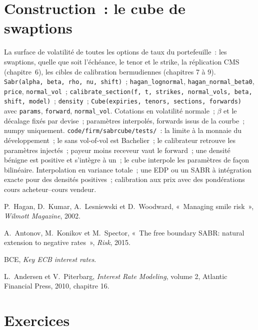 \section{Construction~: le cube de swaptions}\label{bld:rc:sabr-in-rates-and-the-volatility-cube:sabrcube}

\begin{build}
 La surface de volatilité de toutes les options de taux du portefeuille~:
les swaptions, quelle que soit l'échéance, le tenor et le strike, la réplication CMS (chapitre~6),
les cibles de calibration bermudiennes (chapitres 7 à 9).
 \texttt{Sabr(alpha, beta, rho, nu, shift)}~;
\texttt{hagan\_lognormal}, \texttt{hagan\_normal\_beta0}, \texttt{price},
\texttt{normal\_vol}~; \texttt{calibrate\_section(f, t, strikes, normal\_vols,
beta, shift, model)}~; \texttt{density}~; \texttt{Cube(expiries, tenors, sections,
forwards)} avec \texttt{params}, \texttt{forward}, \texttt{normal\_vol}.
 Cotations en volatilité normale~; $\beta$ et le décalage fixés par
devise~; paramètres interpolés, forwards issus de la courbe~; numpy uniquement.
 \texttt{code/firm/sabrcube/tests/}~: la limite à la monnaie
du développement~; le  sans vol-of-vol est Bachelier~; le
calibrateur retrouve les paramètres injectés~; payeur moins receveur vaut le forward~;
une densité bénigne est positive et s'intègre à un~; le cube interpole
les paramètres de façon bilinéaire.
 Interpolation en variance totale~; une EDP ou un SABR à intégration exacte
pour des densités positives~; calibration aux prix avec des pondérations cours acheteur--cours vendeur.
\end{build}

\begin{omsources}
\item P.\ Hagan, D.\ Kumar, A.\ Lesniewski et D.\ Woodward, «~Managing smile
risk~», \emph{Wilmott Magazine}, 2002.
\item A.\ Antonov, M.\ Konikov et M.\ Spector, «~The free boundary SABR:
natural extension to negative rates~», \emph{Risk}, 2015.
\item BCE, \emph{Key ECB interest rates}.
\item L.\ Andersen et V.\ Piterbarg, \emph{Interest Rate Modeling}, volume 2,
Atlantic Financial Press, 2010, chapitre 16.
\end{omsources}

\section{Exercices}

